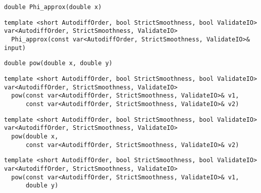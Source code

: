\begin{tcolorbox}[colback=white,colframe=gray90, coltitle=black,boxrule=3pt,
fonttitle=\bfseries,title= Phi Approx]

\begin{verbatim}
double Phi_approx(double x)

\end{verbatim}

\begin{verbatim}
template <short AutodiffOrder, bool StrictSmoothness, bool ValidateIO>
var<AutodiffOrder, StrictSmoothness, ValidateIO>
  Phi_approx(const var<AutodiffOrder, StrictSmoothness, ValidateIO>& input)

\end{verbatim}

\end{tcolorbox}

\begin{tcolorbox}[colback=white,colframe=gray90, coltitle=black,boxrule=3pt,
fonttitle=\bfseries,title= Pow]

\begin{verbatim}
double pow(double x, double y)

\end{verbatim}

\begin{verbatim}
template <short AutodiffOrder, bool StrictSmoothness, bool ValidateIO>
var<AutodiffOrder, StrictSmoothness, ValidateIO>
  pow(const var<AutodiffOrder, StrictSmoothness, ValidateIO>& v1,
      const var<AutodiffOrder, StrictSmoothness, ValidateIO>& v2)

\end{verbatim}

\begin{verbatim}
template <short AutodiffOrder, bool StrictSmoothness, bool ValidateIO>
var<AutodiffOrder, StrictSmoothness, ValidateIO>
  pow(double x,
      const var<AutodiffOrder, StrictSmoothness, ValidateIO>& v2)

\end{verbatim}

\begin{verbatim}
template <short AutodiffOrder, bool StrictSmoothness, bool ValidateIO>
var<AutodiffOrder, StrictSmoothness, ValidateIO>
  pow(const var<AutodiffOrder, StrictSmoothness, ValidateIO>& v1,
      double y)

\end{verbatim}

\end{tcolorbox}

